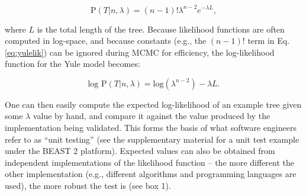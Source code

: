 \documentclass[oneside]{article}
\begin{document}
\begin{equation}
  \text{P}(T|n,\lambda) = (n-1)!\lambda^{n-2}e^{-\lambda L},
  \label{eq:yulelik}
\end{equation}

\noindent where $L$ is the total length of the tree.
Because likelihood functions are often computed in log-space, and
because constants (e.g., the $(n-1)!$ term in Eq. \ref{eq:yulelik}) can be
ignored during MCMC for efficiency, the log-likelihood function for the Yule model
becomes:

\begin{equation}
\text{log P}(T|n,\lambda) = \text{log}(\lambda^{n-2}) - \lambda L.
\end{equation}

\noindent One can then easily compute the expected log-likelihood of an example
tree given some $\lambda$ value by hand, and compare it against the
value produced by the implementation being validated.
This forms the basis of what software engineers refer to as ``unit
testing'' (see the supplementary material for a unit test example
under the BEAST 2 platform).
Expected values can also be obtained from independent
implementations of the likelihood function -- the more different the
other implementation (e.g., different algorithms and programming
languages are used), the more robust the test is (see box 1).
\end{document}
